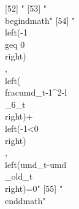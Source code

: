  [52] "%
 [53] "\\begin{dmath}"                                                                                                                                                                                                                                                                                                                                                                                                                                                                                                                                                                                                                               
 [54] "\\left(-1\\geq 0\\right)\\, \\left(\\frac{{umd_{t}}}{-1^{2}}-{{l\\_6}_{t}}\\right)+\\left(-1<0\\right)\\, \\left({umd_{t}}-{{umd\\_old}_{t}}\\right)=0"                                                                                                                                                                                                                                                                                                                                                                                                                                                                                       
 [55] "\\end{dmath}"                                                                                                                                                                                                                                                                                                                                                                                                                                                                                                                                                                                                                                 
